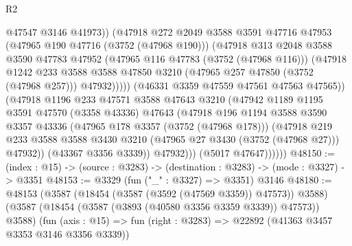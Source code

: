 \begin{lexlean}{R2}
\begin{coremodule}
                            @47547
                            @3146
                            @41973))
                        (@47918
                          @272
                          @2049
                          @3588
                          @3591
                          @47716
                          @47953
                          (@47965 @190 @47716 (@3752 (@47968 @190)))
                          (@47918
                            @313
                            @2048
                            @3588
                            @3590
                            @47783
                            @47952
                            (@47965 @116 @47783 (@3752 (@47968 @116)))
                            (@47918
                              @1242
                              @233
                              @3588
                              @3588
                              @47850
                              @3210
                              (@47965 @257 @47850 (@3752 (@47968 @257)))
                              @47932)))))
                    (@46331 @3359 @47559 @47561 @47563 @47565))
                  (@47918
                    @1196
                    @233
                    @47571
                    @3588
                    @47643
                    @3210
                    (@47942
                      @1189
                      @1195
                      @3591
                      @47570
                      (@3358 @43336)
                      @47643
                      (@47918
                        @196
                        @1194
                        @3588
                        @3590
                        @3357
                        @43336
                        (@47965 @178 @3357 (@3752 (@47968 @178)))
                        (@47918
                          @219
                          @233
                          @3588
                          @3588
                          @3430
                          @3210
                          (@47965 @27 @3430 (@3752 (@47968 @27)))
                          @47932))
                      (@43367 @3356 @3339))
                    @47932)))
              (@5017 @47647))))))
@48150 := (index : @15) -> (source : @3283) -> (destination : @3283) -> (mode : @3327) -> @3351
@48153 := @3329 (fun ("_" : @3327) => @3351) @3146
@48180 := @48153
    (@3587 (@18454 (@3587 (@3592 (@47569 @3359)) @47573)) @3588)
    (@3587 (@18454 (@3587 (@3893 (@40580 @3356 @3359 @3339)) @47573)) @3588)
    (fun (axis : @15) => fun (right : @3283) => @22892 (@41363 @3457 @3353 @3146 @3356 @3339))

\end{coremodule}
\end{lexlean}
